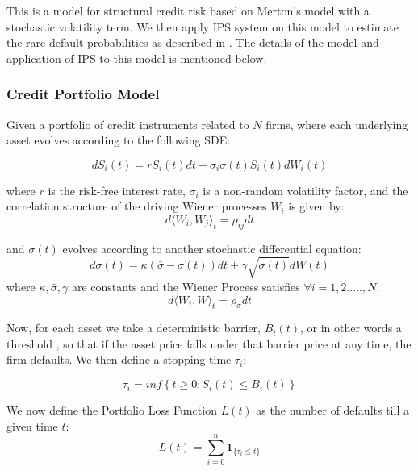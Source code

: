 This is a model for structural credit risk based on Merton's model with a
stochastic volatility term. We then apply IPS system on this model to estimate
the rare default probabilities as described in \cite{CarmonaIPS}. The details of
the model and application of IPS to this model is mentioned below.
\subsubsection{Credit Portfolio Model}
Given a portfolio of credit instruments related to $N$ firms, where each 
underlying asset evolves according to the following SDE:

\begin{equation}
	\label{eq:merton_asset_sde}
	dS_{i}(t) = rS_{i}(t)dt + \sigma_{i}\sigma(t)S_{i}(t)dW_{i}(t)
\end{equation}

where $r$ is the risk-free interest rate, $\sigma_{i}$
is a non-random volatility factor, and the correlation structure of the driving 
Wiener processes $W_{i}$ is given by:
\begin{equation}
	d \langle W_{i}, W_{j} \rangle_{ t} = \rho_{ij} dt
\end{equation}

and $\sigma(t)$ evolves according to another stochastic differential equation:
\begin{equation}
	\label{eq:merton_volatility_sde}
	d\sigma(t) = \kappa(\bar{\sigma} - \sigma(t)) dt + \gamma \sqrt{\sigma(t)} dW(t)
\end{equation}
where $\kappa,\bar{\sigma},\gamma$ are constants and the Wiener Process 
satisfies $\forall i = 1,2.....,N$:
\begin{equation}
	d \langle W_{i}, W \rangle _{t} = \rho_{\sigma }dt
\end{equation}

Now, for each asset we take a deterministic barrier, $B_{i}(t)$, or in other 
words a threshold , so that if the asset price falls under that barrier price 
at any time, the firm defaults. We then define a stopping time $\tau_{i}$:

\begin{equation}
	\tau_i = inf\left\lbrace t \geq 0 : S_{i}(t) \leq B_{i}(t) \right\rbrace
\end{equation}

We now define the Portfolio Loss Function $L(t)$ as the number of defaults till 
a given time $t$:
\begin{equation}
	L(t) = \sum_{i =0}^{n} \mathbf{1}_{\lbrace\tau_{i} \leq t \rbrace}
\end{equation}

